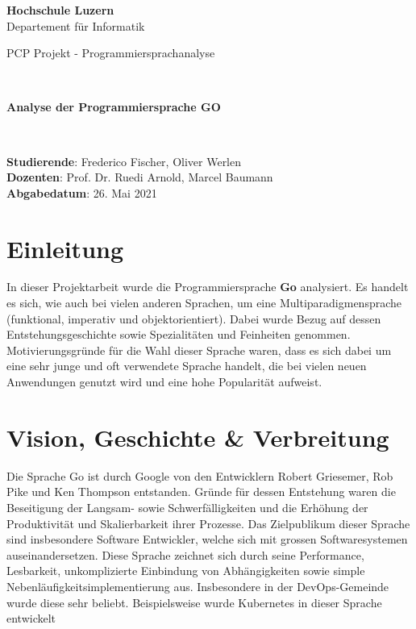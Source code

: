 \documentclass[12pt,titlepage]{article}
\begin{document}
\thispagestyle{empty}

\begin{center}
\textbf{Hochschule Luzern}\\
Departement für Informatik\\[12\baselineskip]

\begin{Huge}
PCP Projekt - Programmiersprachanalyse
\end{Huge} \\[6\baselineskip]

\begin{large}
\textbf{Analyse der Programmiersprache GO}
\end{large} \\[6\baselineskip]

\begin{large}
\textbf{Studierende}: Frederico Fischer, Oliver Werlen\\
\textbf{Dozenten}: Prof. Dr. Ruedi Arnold, Marcel Baumann \\

\textbf{Abgabedatum}: 26. Mai 2021 \\
\end{large}
\end{center}
\newpage


\section{Einleitung}
In dieser Projektarbeit wurde die Programmiersprache \textbf{Go} analysiert.
Es handelt es sich, wie auch bei vielen anderen Sprachen, um eine Multiparadigmensprache (funktional, imperativ und objektorientiert).
Dabei wurde Bezug auf dessen Entstehungsgeschichte sowie Spezialitäten und Feinheiten genommen.
Motivierungsgründe für die Wahl dieser Sprache waren, dass es sich dabei um eine sehr junge und oft verwendete Sprache handelt, die bei vielen neuen Anwendungen genutzt wird und eine hohe Popularität aufweist.

\section{Vision, Geschichte \& Verbreitung}
Die Sprache \glqq Go\grqq{} ist durch Google von den Entwicklern Robert Griesemer, Rob Pike und Ken Thompson entstanden.
Gründe für dessen Entstehung waren die Beseitigung der Langsam- sowie Schwerfälligkeiten und die Erhöhung der Produktivität und Skalierbarkeit ihrer Prozesse.
Das Zielpublikum dieser Sprache sind insbesondere Software Entwickler, welche sich mit grossen Softwaresystemen auseinandersetzen.
Diese Sprache zeichnet sich durch seine Performance, Lesbarkeit, unkomplizierte Einbindung von Abhängigkeiten sowie simple Nebenläufigkeitsimplementierung aus.
Insbesondere in der DevOps-Gemeinde wurde diese sehr beliebt.
Beispielsweise wurde Kubernetes in dieser Sprache entwickelt
\end{document}
